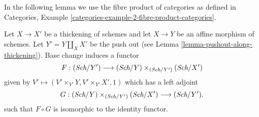 \noindent
In the following lemma we use the fibre product of categories as
defined in
Categories, Example \ref{categories-example-2-fibre-product-categories}.

\begin{lemma}
\label{lemma-equivalence-categories-schemes-over-pushout}
Let $X \to X'$ be a thickening of schemes and let $X \to Y$ be an
affine morphism of schemes. Let $Y' = Y \amalg_X X'$ be the push out
(see Lemma \ref{lemma-pushout-along-thickening}). Base change induces
a functor
$$
F : (\textit{Sch}/Y') \longrightarrow (\textit{Sch}/Y) \times_{(\textit{Sch}/Y')} (\textit{Sch}/X')
$$
given by $V' \longmapsto (V' \times_{Y'} Y, V' \times_{Y'} X', 1)$
which has a left adjoint
$$
G : (\textit{Sch}/Y) \times_{(\textit{Sch}/Y')} (\textit{Sch}/X') \longrightarrow (\textit{Sch}/Y').
$$
such that $F \circ G$ is isomorphic to the identity functor.
\end{lemma}

